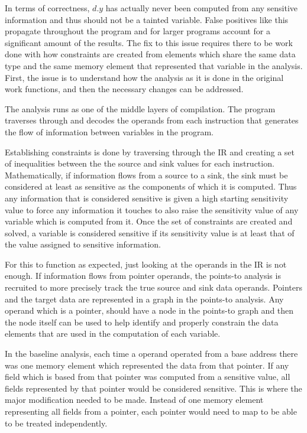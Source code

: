 \documentclass[11pt,a4paper]{article}
\begin{document}
  In terms of correctness, $d.y$ has actually never been computed from any
  sensitive information and thus should not be a tainted variable. False
  positives like this propagate throughout the program and for larger programs
  account for a significant amount of the results. The fix to this issue
  requires there to be work done with how constraints are created from elements
  which share the same data type and the same memory element that represented
  that variable in the analysis. First, the issue is to understand how the
  analysis as it is done in the original work functions, and then the necessary
  changes can be addressed.

  The analysis runs as one of the middle layers of compilation. The program
  traverses through and decodes the operands from each instruction that
  generates the flow of information between variables in the program.

  Establishing constraints is done by traversing through the IR and creating a
  set of inequalities between the the source and sink values for each
  instruction. Mathematically, if information flows from a source to a sink, the
  sink must be considered at least as sensitive as the components of which it is
  computed. Thus any information that is considered sensitive is given a high
  starting sensitivity value to force any information it touches to also raise
  the sensitivity value of any variable which is computed from it. Once the set
  of constraints are created and solved, a variable is considered sensitive if
  its sensitivity value is at least that of the value assigned to sensitive
  information.

  
  For this to function as expected, just looking at the operands in the IR is
  not enough. If information flows from pointer operands, the points-to analysis
  is recruited to more precisely track the true source and sink data operands.
  Pointers and the target data are represented in a graph in the points-to
  analysis. Any operand which is a pointer, should have a node in the points-to
  graph and then the node itself can be used to help identify and properly
  constrain the data elements that are used in the computation of each variable.

  In the baseline analysis, each time a operand operated from a base address
  there was one memory element which represented the data from that pointer. If
  any field which is based from that pointer was computed from a sensitive
  value, all fields represented by that pointer would be considered sensitive.
  This is where the major modification needed to be made. Instead of one memory
  element representing all fields from a pointer, each pointer would need to map
  to be able to be treated independently.
\end{document}
